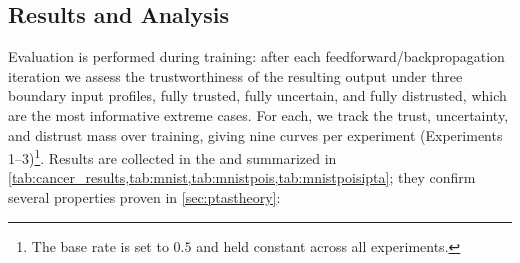 \subsection{Results and Analysis}
Evaluation is performed during training: after each feedforward/backpropagation iteration we assess the trustworthiness of the resulting output under three boundary input profiles, fully trusted, fully uncertain, and fully distrusted, which are the most informative extreme cases. For each, we track the trust, uncertainty, and distrust mass over training, giving nine curves per experiment (Experiments 1--3)\footnote{The base rate is set to $0.5$ and held constant across all experiments.}. Results are collected in the \supp and summarized in \cref{tab:cancer_results,tab:mnist,tab:mnistpois,tab:mnistpoisipta}; they confirm several properties proven in \cref{sec:ptastheory}:

